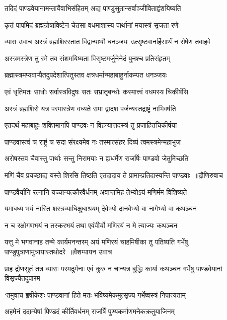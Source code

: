 \twolineshloka
{तदिदं पाण्डवेयानामन्तायैवाभिसंहितम्}
{अद्य पाण्डुसुतान्सर्वाञ्जीविताद्वंशयिष्यति}


\twolineshloka
{कृतं पापमिदं ब्रह्मन्रोषाविष्टेन चेतसा}
{वधमाशास्य पार्थानां मयास्त्रं सृजता रणे}


\threelineshloka
{व्यास उवाच}
{अस्त्रं ब्रह्मशिरस्तात विद्वान्पार्थो धनञ्जयः}
{उत्सृष्टवानहिंसार्थं न रोषेण तवाहवे}


\twolineshloka
{अस्त्रमस्त्रेण तु रमे तव संशमयिष्यता}
{विसृष्टमर्जुनेनेदं पुनश्च प्रतिसंहृतम्}


\twolineshloka
{ब्रह्मास्त्रमप्यवाप्यैतदुपदेशात्पितुस्तव}
{क्षत्रधर्मान्महाबाहुर्नाकम्पत धनञ्जयः}


\twolineshloka
{एवं धृतिमतः साधोः सर्वास्त्रविदुषः सतः}
{सभ्रातृबन्धोः कस्मात्त्वं वधमस्य चिकीर्षसि}


\twolineshloka
{अस्त्रं ब्रह्मशिरो यत्र परमास्त्रेण वध्यते}
{समा द्वादश पर्जन्यस्तद्राष्ट्रं नाभिवर्षति}


\twolineshloka
{एतदर्थं महाबाहुः शक्तिमानपि पाण्डवः}
{न विहन्यात्तदस्त्रं तु प्रजाहितचिकीर्षया}


\twolineshloka
{पाण्डवास्त्वं च राष्ट्रं च सदा संरक्ष्यमेव नः}
{तस्मात्संहर दिव्यं त्वमस्त्रमेन्महाभुज}


\threelineshloka
{अरोषस्तव चैवास्तु पार्थाः सन्तु निरामयाः}
{न ह्यधर्मेण राजर्षिः पाण्डवो जेतुमिच्छति}
{}


\threelineshloka
{मणिं चैव प्रयच्छाद्य यस्ते शिरसि तिष्ठति}
{एतदादाय ते प्रामान्प्रतिदास्यन्ति पाण्डवाः ॥द्रौणिरुवाच}
{}


\twolineshloka
{पाण्डवैर्यानि रत्नानि यच्चान्यत्कौरवैर्धनम्}
{अवाप्तमिह तेभ्योऽयं मणिर्मम विशिष्यते}


\twolineshloka
{यमाबध्य भयं नास्ति शस्त्रव्याधिक्षुधाश्रयम्}
{देवेभ्यो दानवेभ्यो वा नागेभ्यो वा कथञ्चन}


\twolineshloka
{न च रक्षोगणभयं न तस्करभयं तथा}
{एवंवीर्यो मणिरयं न मे त्याज्यः कथञ्चन}


\fourlineindentedshloka
{यत्तु मे भगवानाह तन्मे कार्यमनन्तरम्}
{अयं मणिरयं चाहमिषीका तु पतिष्यति}
{गर्भेषु पाण्डुपुत्राणामुत्रायास्तथोदरे ॥वैशम्पायन उवाच}
{}


प्राह द्रोणसुतं तत्र व्यासः परमदुर्मनाः
\twolineshloka
{एवं कुरु न चान्यत्र बुद्धिः कार्या कथञ्चन}
{गर्भेषु पाण्डवेयानां विसृज्यैतदुपारम}


\twolineshloka
{`तमुवाच हृषीकेशः पाण्डवानां हिते मतः}
{भविष्यमेकमुत्सृज्य गर्भेष्वस्त्रं निपात्यताम्}


\twolineshloka
{अहमेनं ददाम्येषां पिण्डदं कीर्तिवर्धनम्}
{राजर्षिं पुण्यकर्माणमनेकक्रतुयाजिनम्}


